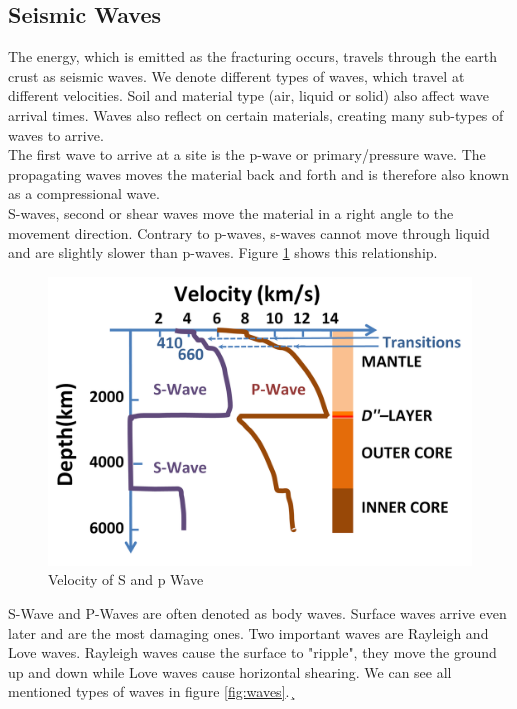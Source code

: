 \documentclass[thesis.tex]{subfiles}
\begin{document}
\subsection{Seismic Waves} 
The energy, which is emitted as the fracturing occurs, travels through the earth crust as seismic waves. We denote different types of waves, which travel at different velocities. Soil and material type (air, liquid or solid) also affect wave arrival times. Waves also reflect on certain materials, creating many sub-types of waves to arrive.\\
The first wave to arrive at a site is the p-wave or primary/pressure wave. The propagating waves moves the material back and forth and is therefore also known as a compressional wave. \\
S-waves, second or shear waves move the material in a right angle to the movement direction. Contrary to p-waves, s-waves cannot move through liquid and are slightly slower than p-waves. Figure \ref{fig:speedwaves} shows this relationship.
\begin{figure}[h!]
	\centering
	\includegraphics[width=0.6\linewidth]{../pictures/Prerequisites/Speeds_of_seismic_waves.PNG}
	\caption{Velocity of S and p Wave}
	\label{fig:speedwaves}
\end{figure}
S-Wave and P-Waves are often denoted as body waves. Surface waves arrive even later and are the most damaging ones. Two important waves are Rayleigh and Love waves. Rayleigh waves cause the surface to "ripple", they move the ground up and down while Love waves cause horizontal shearing.
We can see all mentioned types of waves in figure \ref{fig:waves}.¸
\end{document}
